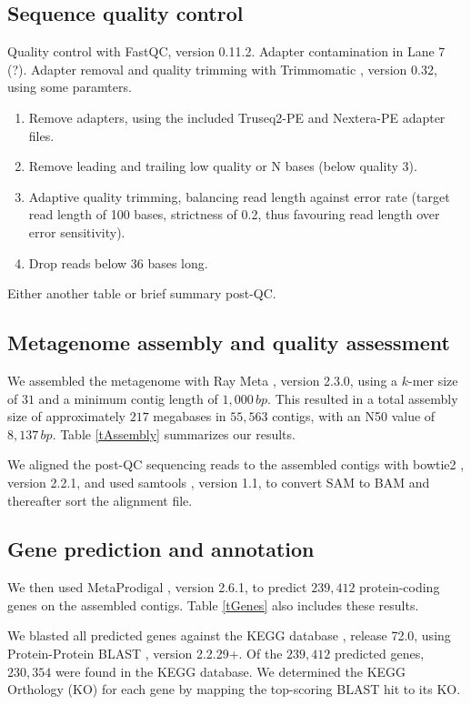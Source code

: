 \documentclass{bmcart}
\begin{document}
\subsection*{Sequence quality control}
Quality control with FastQC, version 0.11.2. Adapter contamination in Lane 7 (?). Adapter removal and quality trimming with Trimmomatic \cite{Trimmomatic}, version 0.32, using some paramters.
\begin{enumerate}
\item Remove adapters, using the included Truseq2-PE and Nextera-PE adapter files.
\item Remove leading and trailing low quality or N bases (below quality 3).
\item Adaptive quality trimming, balancing read length against error rate (target read length of 100 bases, strictness of 0.2, thus favouring read length over error sensitivity).
\item Drop reads below 36 bases long.
\end{enumerate}
Either another table or brief summary post-QC.
%
\subsection*{Metagenome assembly and quality assessment}
We assembled the metagenome with Ray Meta \cite{RayMeta}, version 2.3.0, using a $k$-mer size of $31$ and a minimum contig length of $1,000\,bp$.
This resulted in a total assembly size of approximately $217$ megabases in $55,563$ contigs, with an N50 value of $8,137\,bp$.
Table \ref{tAssembly} summarizes our results.

We aligned the post-QC sequencing reads to the assembled contigs with bowtie2 \cite{Bowtie2}, version 2.2.1, and used samtools \cite{Samtools}, version 1.1, to convert SAM to BAM and thereafter sort the alignment file.
%
\subsection*{Gene prediction and annotation}
We then used MetaProdigal \cite{MetaProdigal}, version 2.6.1, to predict $239,412$ protein-coding genes on the assembled contigs. Table \ref{tGenes} also includes these results.

We blasted all predicted genes against the KEGG database \cite{KeggDB}, release 72.0, using Protein-Protein BLAST \cite{BlastPlus}, version 2.2.29+. 
Of the $239,412$ predicted genes, $230,354$ were found in the KEGG database.
We determined the KEGG Orthology (KO) for each gene by mapping the top-scoring BLAST hit to its KO.
\end{document}
